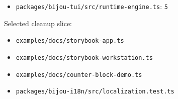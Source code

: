 \begin{itemize}
\item
  \texttt{p\allowbreak{}a\allowbreak{}c\allowbreak{}k\allowbreak{}a\allowbreak{}g\allowbreak{}e\allowbreak{}s\allowbreak{}/\allowbreak{}b\allowbreak{}i\allowbreak{}j\allowbreak{}o\allowbreak{}u\allowbreak{}-\allowbreak{}t\allowbreak{}u\allowbreak{}i\allowbreak{}/\allowbreak{}s\allowbreak{}r\allowbreak{}c\allowbreak{}/\allowbreak{}r\allowbreak{}u\allowbreak{}n\allowbreak{}t\allowbreak{}i\allowbreak{}m\allowbreak{}e\allowbreak{}-\allowbreak{}e\allowbreak{}n\allowbreak{}g\allowbreak{}i\allowbreak{}n\allowbreak{}e\allowbreak{}.\allowbreak{}t\allowbreak{}s}: \texttt{5}
\end{itemize}

Selected cleanup slice:

\begin{itemize}
\tightlist
\item
  \texttt{e\allowbreak{}x\allowbreak{}a\allowbreak{}m\allowbreak{}p\allowbreak{}l\allowbreak{}e\allowbreak{}s\allowbreak{}/\allowbreak{}d\allowbreak{}o\allowbreak{}c\allowbreak{}s\allowbreak{}/\allowbreak{}s\allowbreak{}t\allowbreak{}o\allowbreak{}r\allowbreak{}y\allowbreak{}b\allowbreak{}o\allowbreak{}o\allowbreak{}k\allowbreak{}-\allowbreak{}a\allowbreak{}p\allowbreak{}p\allowbreak{}.\allowbreak{}t\allowbreak{}s}
\item
  \texttt{e\allowbreak{}x\allowbreak{}a\allowbreak{}m\allowbreak{}p\allowbreak{}l\allowbreak{}e\allowbreak{}s\allowbreak{}/\allowbreak{}d\allowbreak{}o\allowbreak{}c\allowbreak{}s\allowbreak{}/\allowbreak{}s\allowbreak{}t\allowbreak{}o\allowbreak{}r\allowbreak{}y\allowbreak{}b\allowbreak{}o\allowbreak{}o\allowbreak{}k\allowbreak{}-\allowbreak{}w\allowbreak{}o\allowbreak{}r\allowbreak{}k\allowbreak{}s\allowbreak{}t\allowbreak{}a\allowbreak{}t\allowbreak{}i\allowbreak{}o\allowbreak{}n\allowbreak{}.\allowbreak{}t\allowbreak{}s}
\item
  \texttt{e\allowbreak{}x\allowbreak{}a\allowbreak{}m\allowbreak{}p\allowbreak{}l\allowbreak{}e\allowbreak{}s\allowbreak{}/\allowbreak{}d\allowbreak{}o\allowbreak{}c\allowbreak{}s\allowbreak{}/\allowbreak{}c\allowbreak{}o\allowbreak{}u\allowbreak{}n\allowbreak{}t\allowbreak{}e\allowbreak{}r\allowbreak{}-\allowbreak{}b\allowbreak{}l\allowbreak{}o\allowbreak{}c\allowbreak{}k\allowbreak{}-\allowbreak{}d\allowbreak{}e\allowbreak{}m\allowbreak{}o\allowbreak{}.\allowbreak{}t\allowbreak{}s}
\item
  \texttt{p\allowbreak{}a\allowbreak{}c\allowbreak{}k\allowbreak{}a\allowbreak{}g\allowbreak{}e\allowbreak{}s\allowbreak{}/\allowbreak{}b\allowbreak{}i\allowbreak{}j\allowbreak{}o\allowbreak{}u\allowbreak{}-\allowbreak{}i\allowbreak{}1\allowbreak{}8\allowbreak{}n\allowbreak{}/\allowbreak{}s\allowbreak{}r\allowbreak{}c\allowbreak{}/\allowbreak{}l\allowbreak{}o\allowbreak{}c\allowbreak{}a\allowbreak{}l\allowbreak{}i\allowbreak{}z\allowbreak{}a\allowbreak{}t\allowbreak{}i\allowbreak{}o\allowbreak{}n\allowbreak{}.\allowbreak{}t\allowbreak{}e\allowbreak{}s\allowbreak{}t\allowbreak{}.\allowbreak{}t\allowbreak{}s}

\end{itemize}
